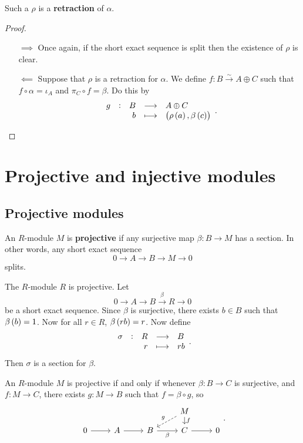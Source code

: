 Such a $ \rho $ is a \textbf{retraction} of $ \alpha $.

\begin{proof}
\hfill
\begin{itemize}
\item[$ \implies $] Once again, if the short exact sequence is split then the existence of $ \rho $ is clear.
\item[$ \impliedby $] Suppose that $ \rho $ is a retraction for $ \alpha $. We define $ f : B \xrightarrow{\sim} A \oplus C $ such that $ f \circ \alpha = \iota_A $ and $ \pi_C \circ f = \beta $. Do this by
$$ \function[g]{B}{A \oplus C}{b}{\br{\rho\br{a}, \beta\br{c}}}. $$
\end{itemize}
\end{proof}

\pagebreak

\section{Projective and injective modules}

\subsection{Projective modules}


\begin{definition}
An $ R $-module $ M $ is \textbf{projective} if any surjective map $ \beta : B \to M $ has a section. In other words, any short exact sequence
$$ 0 \to A \to B \to M \to 0 $$
splits.
\end{definition}

\begin{example*}
The $ R $-module $ R $ is projective. Let
$$ 0 \to A \to B \xrightarrow{\beta} R \to 0 $$
be a short exact sequence. Since $ \beta $ is surjective, there exists $ b \in B $ such that $ \beta\br{b} = 1 $. Now for all $ r \in R $, $ \beta\br{rb} = r $. Now define
$$ \function[\sigma]{R}{B}{r}{rb}. $$
Then $ \sigma $ is a section for $ \beta $.
\end{example*}

\begin{proposition}
An $ R $-module $ M $ is projective if and only if whenever $ \beta : B \to C $ is surjective, and $ f : M \to C $, there exists $ g : M \to B $ such that $ f = \beta \circ g $, so
$$
\begin{tikzcd}[row sep=small]
& & & M \arrow[dashed, swap]{dl}{g} \arrow{d}{f} & \\
0 \arrow{r} & A \arrow{r} & B \arrow[swap]{r}{\beta} & C \arrow{r} & 0
\end{tikzcd}.
$$
\end{proposition}

